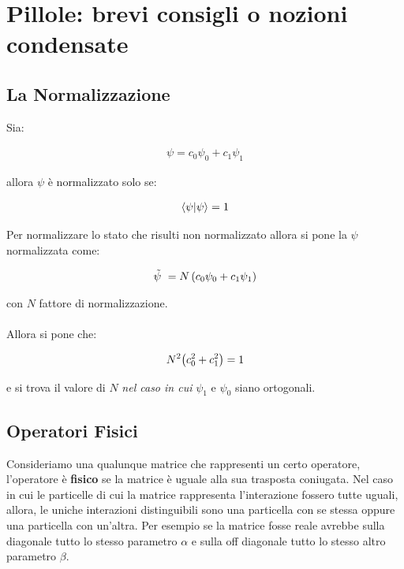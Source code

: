 \chapter{Pillole: brevi consigli o nozioni condensate}


\section{La Normalizzazione}

	Sia:
	
\begin{align*}
	\psi = c_0 \psi_0 + c_1 \psi_1
\end{align*}
	
	allora $\psi$ è normalizzato solo se:
	
\begin{align*}
	\braket{\psi}{\psi} = 1
\end{align*}

	Per normalizzare lo stato che risulti non normalizzato allora si pone la $\psi$ normalizzata come:

\begin{align*}
	\tilde{\psi} = N \, \qty(c_0 \psi_0 + c_1 \psi_1)
\end{align*}

	con $N$ fattore di normalizzazione.
	\\
	\\
	Allora si pone che:

\begin{align*}
	N^2\qty(c_0^2 + c_1^2) = 1
\end{align*}

	e si trova il valore di $N$ \textit{nel caso in cui} $\psi_1$ e $\psi_0$ siano ortogonali.


\section{Operatori Fisici}

	Consideriamo una qualunque matrice che rappresenti un certo operatore, l'operatore è \textbf{fisico} se la matrice è uguale alla sua trasposta coniugata. Nel caso in cui le particelle di cui la matrice rappresenta l'interazione fossero tutte uguali, allora, le uniche interazioni distinguibili sono una particella con se stessa oppure una particella con un'altra. Per esempio se la matrice fosse reale avrebbe sulla diagonale tutto lo stesso parametro $\alpha$ e sulla off diagonale tutto lo stesso altro parametro $\beta$.

